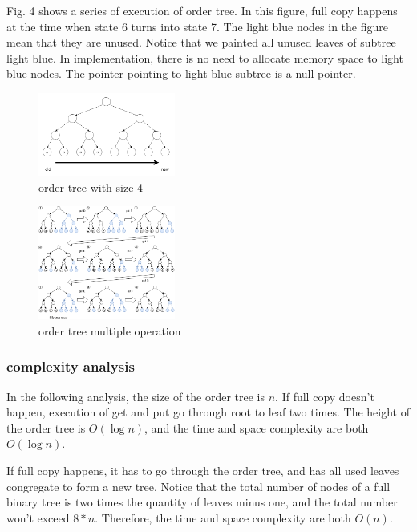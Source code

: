 \documentclass[conference]{IEEEtran}
\begin{document}
Fig. 4 shows a series of execution of order tree. In this figure, full copy happens at the time when state 6 turns into state 7. The light blue nodes in the figure mean that they are unused. Notice that we painted all unused leaves of subtree light blue.
In implementation, there is no need to allocate memory space to light blue nodes. The pointer pointing to light blue subtree is a null pointer.

\begin{figure}
  \centering
  \includegraphics[width=0.4\textwidth]{../images/order-tree}
  \caption{order tree with size 4}
\end{figure}

\begin{figure}
  \centering
  \includegraphics[width=0.4\textwidth]{../images/order-trees}
  \caption{order tree multiple operation}
\end{figure}

\subsubsection{complexity analysis}
In the following analysis, the size of the order tree is $n$.
If full copy doesn’t happen, execution of get and put go through root to leaf two times.
The height of the order tree is $O(\log n)$, and the time and space complexity are both $O(\log n)$.  

If full copy happens, it has to go through the order tree,
and has all used leaves congregate to form a new tree.
Notice that the total number of nodes of a full binary tree is two times the quantity of leaves minus one,
and the total number won’t exceed $8*n$.
Therefore, the time and space complexity are both $O(n)$.
\end{document}
